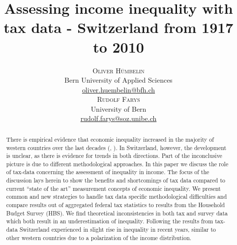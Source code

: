 \documentclass[twoside]{article}\usepackage[]{graphicx}\usepackage[]{color}
\title{\vspace{-15mm}\fontsize{24pt}{10pt}\selectfont\textbf{Assessing income inequality with tax data - Switzerland from 1917 to 2010}} %
\author{
\large
\textsc{Oliver Hümbelin}\\[2mm] %
\normalsize Bern University of Applied Sciences \\ %
\normalsize \href{mailto:oliver.huembelin@bfh.ch}{oliver.huembelin@bfh.ch} %
\vspace{5mm}\\
\large
\textsc{Rudolf Farys}\\[2mm] %
\normalsize University of Bern \\ %
\normalsize \href{mailto:rudolf.farys@soz.unibe.ch}{rudolf.farys@soz.unibe.ch} %
\vspace{-5mm}
}
\date{}
\begin{document}
\maketitle 

\thispagestyle{fancy} %





\begin{abstract}
There is empirical evidence that economic inequality increased in the majority of western countries over the last decades (\citealt{oecd_divided_2011}, \citealt{gornick_income_2013}). 
In Switzerland, however, the development is unclear, as there is evidence for trends in both directions. Part of the inconclusive picture is due to different methodological approaches. In this paper we discuss the role of tax-data concerning the assessment of inequality in income. 
The focus of the discussion lays herein to show the benefits and shortcomings of tax data compared to current ``state of the art'' measurement concepts of economic inequality. 
We present common and new strategies to handle tax data specific methodological difficulties and compare results out of aggregated federal tax statistics to results from the Household Budget Survey (HBS). 
We find theoretical inconsistencies in both tax and survey data which both result in an underestimation of inequality.
Following the results from tax-data Switzerland experienced in slight rise in inequality in recent years, similar to other western countries due to a polarization of the income distribution.




\end{abstract}


\end{document}
